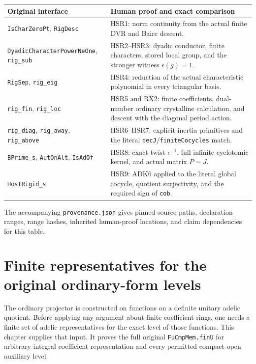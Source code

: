 \documentclass[11pt,a4paper]{article}
\numberwithin{equation}{section}
\theoremstyle{remark}\newtheorem{remark}[theorem]{Remark}
\begin{document}
\begin{center}
\begin{tabular}{p{}p{}}
Original interface & Human proof and exact comparison \\
\hline
\texttt{Is\allowbreak Char\allowbreak Zero\allowbreak Pt}, \texttt{Rig\allowbreak Desc}
 & HSR1: norm continuity from the actual finite DVR and Baire descent.\\
\texttt{Dyadic\allowbreak Character\allowbreak Power\allowbreak Ne\allowbreak One}, \texttt{rig\_\allowbreak sub}
 & HSR2--HSR3: dyadic conductor, finite characters, stored local group,
   and the stronger witness $\epsilon(g)=1$.\\
\texttt{Rig\allowbreak Sep}, \texttt{rig\_\allowbreak eig}
 & HSR4: reduction of the actual characteristic polynomial in every
   triangular basis.\\
\texttt{rig\_\allowbreak fin}, \texttt{rig\_\allowbreak loc}
 & HSR5 and RX2: finite coefficients, dual-number ordinary
   crystalline calculation, and descent with the diagonal period action.\\
\texttt{rig\_\allowbreak diag}, \texttt{rig\_\allowbreak away}, \texttt{rig\_\allowbreak above}
 & HSR6--HSR7: explicit inertia primitives and the literal
   \texttt{dec\allowbreak J}/\texttt{finite\allowbreak Cocycles} match.\\
\texttt{BPrime\_\allowbreak s}, \texttt{Aut\allowbreak On\allowbreak Alt}, \texttt{Is\allowbreak Ad\allowbreak Of}
 & HSR8: exact twist $\epsilon^{-1}$, full infinite cyclotomic
   kernel, and actual matrix $P=J$.\\
\texttt{Host\allowbreak Rigid\_\allowbreak s}
 & HSR9: ADK6 applied to the literal global cocycle, quotient
   surjectivity, and the required sign of \texttt{cob}.\\
\end{tabular}
\end{center}

The accompanying \texttt{provenance.\allowbreak json} gives pinned source
paths, declaration ranges, range hashes, inherited human-proof
locations, and claim dependencies for this table.


\section{Finite representatives for the original ordinary-form levels}
\label{sec:finite-levels-v42}

The ordinary projector is constructed on functions on a definite unitary
adelic quotient.  Before applying any argument about finite coefficient
rings, one needs a finite set of adelic representatives for the exact level
of those functions.  This chapter supplies that input.  It proves the full
original \texttt{Fu\allowbreak Cmp\allowbreak Mem.\allowbreak fin\allowbreak U} for arbitrary integral coefficient
representation and every permitted compact-open auxiliary level.
\end{document}
